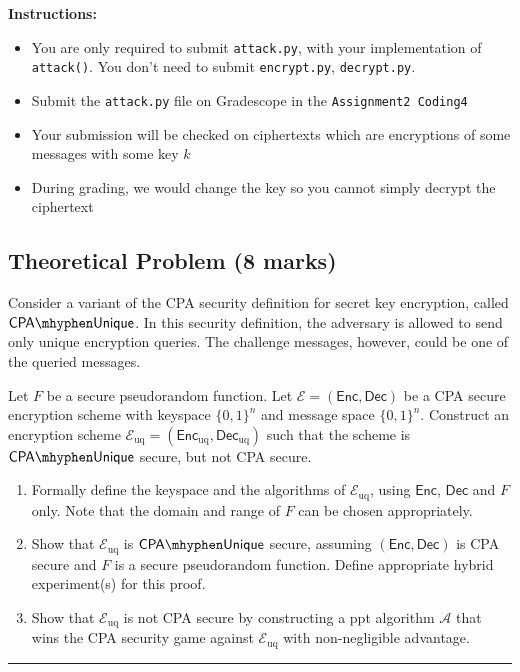 \documentclass[11pt]{article}
\newcommand{\CPA}{\mathsf{CPA}}
\newcommand{\INDCPAUQ}{\CPA\mhyphen \mathsf{Unique}}
\newcommand{\uniq}{\mathrm{uq}}
\newcommand{\enc}{\mathsf{Enc}}
\newcommand{\dec}{\mathsf{Dec}}
\newcommand{\calA}{\mathcal{A}}
\newcommand{\calE}{\mathcal{E}}
\begin{document}
        \textbf{Instructions:}
        \begin{itemize}
            \item You are only required to submit \texttt{attack.py}, with your implementation of \texttt{attack()}. You don't need to submit \texttt{encrypt.py}, \texttt{decrypt.py}.
            \item Submit the \texttt{attack.py} file on Gradescope in the \texttt{Assignment2 Coding4}
            \item Your submission will be checked on ciphertexts which are encryptions of some messages with some key $k$
            \item During grading, we would change the key so you cannot simply decrypt the ciphertext
        \end{itemize}
            
   
        \newpage 
        \subsection{Theoretical Problem (8 marks)}
        \label{sec:theoretical}
        \label{qn:theory}


        Consider a variant of the CPA security definition for secret key encryption, called $\INDCPAUQ$. In this security definition, the adversary is allowed to send only unique encryption queries. The challenge messages, however, could be one of the queried messages.

        Let $F$ be a secure pseudorandom function. Let $\calE = (\enc, \dec)$ be a CPA secure encryption scheme with keyspace $\{0,1\}^n$ and message space $\{0, 1\}^n$. Construct an encryption scheme $\calE_{\uniq} = (\enc_{\uniq}, \dec_{\uniq})$ such that the scheme is $\INDCPAUQ$ secure, but not CPA secure. 

        \begin{enumerate}
      
            \item Formally define the keyspace and the algorithms of $\calE_{\uniq}$, using $\enc$, $\dec$ and $F$ only. Note that the domain and range of $F$ can be chosen appropriately. 
            \item Show that $\calE_{\uniq}$ is $\INDCPAUQ$ secure, assuming $(\enc, \dec)$ is CPA secure and $F$ is a secure pseudorandom function. Define appropriate hybrid experiment(s) for this proof. 
            \item Show that $\calE_{\uniq}$ is not CPA secure by constructing a ppt algorithm $\calA$ that wins the CPA security game against $\calE_{\uniq}$ with non-negligible advantage.  
        \end{enumerate}

    \hrule 

    
    
\end{document}
